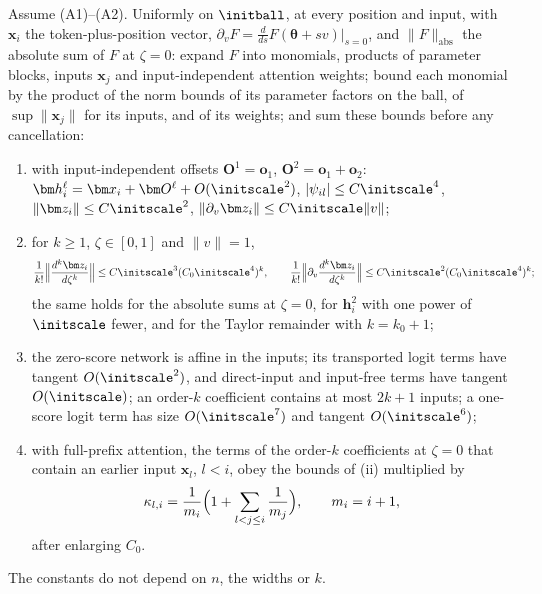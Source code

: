 \begin{proposition}
\label{prop:network}
Assume (A1)--(A2). Uniformly on $\initball$, at every position and input, with $\bm x_i$ the token-plus-position vector,
$\partial_vF=\frac{d}{ds}F(\bm\theta+sv)|_{s=0}$, and $\|F\|_{\mathrm{abs}}$ the absolute sum of $F$ at $\zeta=0$: expand $F$ into monomials, products of
parameter blocks, inputs $\bm x_j$ and input-independent attention weights; bound each monomial by the product of the norm bounds of its
parameter factors on the ball, of $\sup\|\bm x_j\|$ for its inputs, and of its weights; and sum these bounds before any cancellation:
\begin{enumerate}[label=(\roman*),leftmargin=*,itemsep=1pt,topsep=2pt]
\item with input-independent offsets $\bm O^1=\bm o_1$, $\bm O^2=\bm o_1+\bm o_2$: $\bm h_i^\ell=\bm x_i+\bm O^\ell+O(\initscale^2)$, $|\psi_{il}|\le C\initscale^4$,
$\|\bm z_i\|\le C\initscale^2$, $\|\partial_v\bm z_i\|\le C\initscale\|v\|$;
\item for $k\ge1$, $\zeta\in[0,1]$ and $\|v\|=1$,
\[
 \frac{1}{k!}\Bigl\|\frac{d^k\bm z_i}{d\zeta^k}\Bigr\|\le C\initscale^3(C_0\initscale^4)^k,\qquad
 \frac{1}{k!}\Bigl\|\partial_v\frac{d^k\bm z_i}{d\zeta^k}\Bigr\|\le C\initscale^2(C_0\initscale^4)^k;
\]
the same holds for the absolute sums at $\zeta=0$, for $\bm h^2_i$ with one power of $\initscale$ fewer, and for the Taylor remainder with $k=k_0+1$;
\item the zero-score network is affine in the inputs; its transported logit terms have tangent $O(\initscale^2)$, and direct-input and
input-free terms have tangent $O(\initscale)$; an order-$k$ coefficient contains at most $2k+1$ inputs; a one-score logit term has size
$O(\initscale^7)$ and tangent $O(\initscale^6)$;
\item with full-prefix attention, the terms of the order-$k$ coefficients at $\zeta=0$ that contain an earlier input $\bm x_l$, $l<i$, obey the
bounds of (ii) multiplied by
\begin{equation}
 \kappa_{l,i}=\frac{1}{m_i}\Bigl(1+\sum_{l<j\le i}\frac{1}{m_j}\Bigr),\qquad m_i=i+1,
 \label{eq:dilution}
\end{equation}
after enlarging $C_0$.
\end{enumerate}
The constants do not depend on $n$, the widths or $k$.
\end{proposition}

